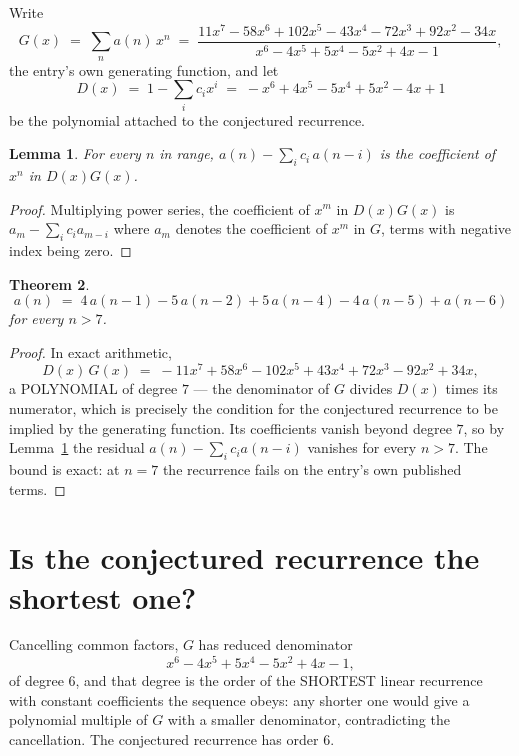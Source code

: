 \documentclass[11pt,a4paper]{article}
\theoremstyle{plain}
\newtheorem{theorem}{Theorem}
\newtheorem{lemma}[theorem]{Lemma}
\theoremstyle{definition}
\begin{document}
Write
\[
G(x)\;=\;\sum_{n}a(n)\,x^{n}\;=\;\frac{11 x^{7} - 58 x^{6} + 102 x^{5} - 43 x^{4} - 72 x^{3} + 92 x^{2} - 34 x}{x^{6} - 4 x^{5} + 5 x^{4} - 5 x^{2} + 4 x - 1},
\]
the entry's own generating function, and let
\[
D(x)\;=\;1-\sum_i c_i x^{i}\;=\;- x^{6} + 4 x^{5} - 5 x^{4} + 5 x^{2} - 4 x + 1
\]
be the polynomial attached to the conjectured recurrence.

\begin{lemma}\label{lem:key}
For every $n$ in range, $a(n)-\sum_i c_i\,a(n-i)$ is the coefficient of $x^{n}$ in
$D(x)G(x)$.
\end{lemma}

\begin{proof}
Multiplying power series, the coefficient of $x^{m}$ in $D(x)G(x)$ is
$a_m-\sum_i c_i a_{m-i}$ where $a_m$ denotes the coefficient of $x^{m}$ in $G$, terms with
negative index being zero.
\end{proof}

\begin{theorem}
\[
a(n)\;=\;4\,a(n-1) - 5\,a(n-2) + 5\,a(n-4) - 4\,a(n-5) + a(n-6)
\]
for every $n>7$.
\end{theorem}

\begin{proof}
In exact arithmetic,
\[
D(x)\,G(x)\;=\;- 11 x^{7} + 58 x^{6} - 102 x^{5} + 43 x^{4} + 72 x^{3} - 92 x^{2} + 34 x,
\]
a POLYNOMIAL of degree $7$ --- the denominator of $G$ divides $D(x)$ times its numerator,
which is precisely the condition for the conjectured recurrence to be implied by the
generating function. Its coefficients vanish beyond degree $7$, so by
Lemma~\ref{lem:key} the residual $a(n)-\sum_ic_ia(n-i)$ vanishes for every
$n>7$. The bound is exact: at $n=7$ the recurrence fails on the entry's own published terms.
\end{proof}

\section{Is the conjectured recurrence the shortest one?}

Cancelling common factors, $G$ has reduced denominator
\[
x^{6} - 4 x^{5} + 5 x^{4} - 5 x^{2} + 4 x - 1,
\]
of degree $6$, and that degree is the order of the SHORTEST linear recurrence with
constant coefficients the sequence obeys: any shorter one would give a polynomial multiple of
$G$ with a smaller denominator, contradicting the cancellation. The conjectured recurrence has
order $6$.
\end{document}
